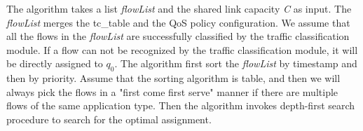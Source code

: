 The algorithm takes a list \emph{flowList} and the shared link capacity \emph{C} as input. The \emph{flowList} merges the tc\_table and the
QoS policy configuration. We assume that all the flows in the \emph{flowList} are successfully classified by the traffic classification module.
If a flow can not be recognized by the traffic classification module, it will be directly assigned to $q_0$. The algorithm first sort the
\emph{flowList} by timestamp and then by priority. Assume that the sorting algorithm is table, and then we will always pick the flows in a
"first come first serve" manner if there are multiple flows of the same application type. Then the algorithm invokes depth-first search procedure
to search for the optimal assignment.
